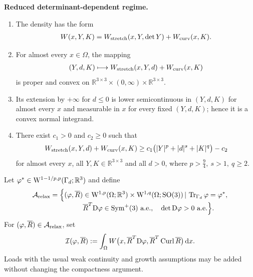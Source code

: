 \documentclass[11pt]{article}
\begin{document}
\medskip
\noindent\textbf{Reduced determinant-dependent regime.}
\begin{enumerate}
\item[H1')] The density has the form
\begin{align}
W(x,Y,K)
=
W_{\rm stretch}(x,Y,\det Y)
+
W_{\rm curv}(x,K).
\end{align}

\item[H2')] For almost every $x\in\Omega$, the mapping
\begin{align}
(Y,d,K)
\longmapsto
W_{\rm stretch}(x,Y,d)+W_{\rm curv}(x,K)
\end{align}
is proper and convex on
$
\mathbb R^{3\times3}\times(0,\infty)\times\mathbb R^{3\times3}.
$

\item[H3')] Its extension by $+\infty$ for $d\leq0$ is lower semicontinuous in $(Y,d,K)$ for almost every $x$ and measurable in $x$ for every fixed $(Y,d,K)$; hence it is a convex normal integrand.

\item[H4')] There exist $c_1>0$ and $c_2\geq0$ such that
\begin{align}
W_{\rm stretch}(x,Y,d)+W_{\rm curv}(x,K)
\geq
c_1\bigl(|Y|^p+|d|^s+|K|^q\bigr)-c_2
\end{align}
for almost every $x$, all $Y,K\in\mathbb R^{3\times3}$ and all $d>0$, where
$
p>\frac94,\  s>1,\ q\geq 2.
$
\end{enumerate}

\medskip


Let $\varphi^*\in {\rm W}^{1-1/p,p}(\Gamma_d;\mathbb R^3)$ and define
\begin{align}
\mathcal A_{\rm relax}
=
\Bigl\{
(\varphi, \overline R )&\in
{\rm W}^{1,p}(\Omega;\mathbb R^3)
\times {\rm W}^{1,q}(\Omega;{\rm SO}(3))  \,|\,
\operatorname{Tr}_{\Gamma_d}\varphi=\varphi^*,
\notag\\[-1mm]
&  \overline R ^T{\rm D}\varphi\in\operatorname{Sym}^{+}(3)\ \text{a.e.},
\quad
\det{\rm D}\varphi>0\ \text{a.e.}
\Bigr\}.
\end{align}
For $(\varphi,  \overline R )\in\mathcal A_{\rm relax}$, set
\begin{align}
\mathcal I(\varphi,  \overline R )
:=
\int_\Omega
W\bigl(x,  \overline R ^T{\rm D}\varphi,
  \overline R ^T\operatorname{Curl}  \overline R \bigr)\,\mathrm dx.
\end{align}
Loads with the usual weak continuity and growth assumptions may be added without changing the compactness argument.
\end{document}

